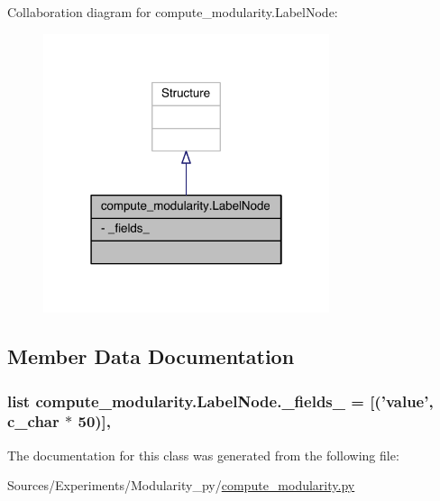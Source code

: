 Collaboration diagram for compute\+\_\+modularity.\+Label\+Node\+:\nopagebreak
\begin{figure}[H]
\begin{center}
\leavevmode
\includegraphics[width=238pt]{classcompute__modularity_1_1_label_node__coll__graph}
\end{center}
\end{figure}


\subsection{Member Data Documentation}
\hypertarget{classcompute__modularity_1_1_label_node_a1531c352cf0422c0360c628750324bd5}{
\subsubsection[{\+\_\+fields\+\_\+}]{\setlength{\rightskip}{0pt plus 5cm}list compute\+\_\+modularity.\+Label\+Node.\+\_\+fields\+\_\+ = \mbox{[}('value', c\+\_\+char $\ast$ 50)\mbox{]}\hspace{0.3cm}{\ttfamily [static]}, {\ttfamily [private]}}}\label{classcompute__modularity_1_1_label_node_a1531c352cf0422c0360c628750324bd5}


The documentation for this class was generated from the following file\+:\begin{DoxyCompactItemize}
\item 
Sources/\+Experiments/\+Modularity\+\_\+py/\hyperlink{compute__modularity_8py}{compute\+\_\+modularity.\+py}\end{DoxyCompactItemize}
